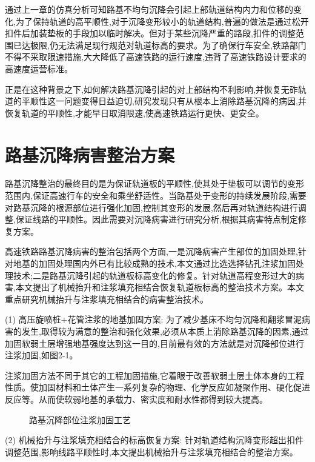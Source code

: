 \documentclass[a4paper,12pt]{ctexrep}
\begin{document}
通过上一章的仿真分析可知路基不均匀沉降会引起上部轨道结构内力和位移的变化,为了保持轨道的高平顺性,对于沉降变形较小的轨道结构,普遍的做法是通过松开扣件后加装垫板的手段加以临时解决。但对于某些沉降严重的路段,扣件的调整范围已达极限,仍无法满足现行规范对轨道标高的要求。为了确保行车安全,铁路部门不得不采取限速措施,大大降低了高速铁路的运行速度,违背了高速铁路设计要求的高速度运营标准。

正是在这种背景之下,如何解决路基沉降引起的对上部结构不利影响,并恢复无砟轨道的平顺性这一问题变得日益迫切,研究发现只有从根本上消除路基沉降的病因,并恢复轨道的平顺性,才能早日取消限速,使高速铁路运行更快、更安全。

\section{路基沉降病害整治方案}

路基沉降整治的最终目的是为保证轨道板的平顺性,使其处于垫板可以调节的变形范围内,保证高速行车的安全和乘坐舒适性。当路基处于变形的持续发展阶段,需要对路基沉降的根源部位进行强化加固,控制其变形的发展,然后再对轨道结构进行调整,保证线路的平顺性。因此需要对沉降病害进行研究分析,根据其病害特点制定修复方案。

高速铁路路基沉降病害的整治包括两个方面,一是沉降病害产生部位的加固处理,针对地基的加固处理国内外已有比较成熟的技术,本文通过比选选择钻孔注浆加固处理技术;二是路基沉降引起的轨道板标高变化的修复。针对轨道高程变形过大的病害,本文提出了机械抬升和注浆填充相结合恢复轨道板标高的整治技术方案。本文重点研究机械抬升与注浆填充相结合的病害整治技术。

(1) 高压旋喷桩+花管注浆的地基加固方案: 为了减少基床不均匀沉降和翻浆冒泥病害的发生,取得较为满意的整治和强化效果,必须从本质上消除路基沉降的因素,通过加固软弱土层增强地基强度达到这一目的,目前最有效的方法就是对沉降部位进行注浆加固,如图2-1。

注浆加固方法不同于其它的工程加固措施,它着眼于改善软弱土层土体本身的工程性质。使加固材料和土体产生一系列复杂的物理、化学反应如凝聚作用、硬化促进反应等。从而使软弱地基的承载力、密实度和耐水性都得到较大提高。

\begin{figure}[htbp]
    \centering
    \caption{路基沉降部位注浆加固工艺}
    \label{fig:2-1}
\end{figure}

(2) 机械抬升与注浆填充相结合的标高恢复方案: 针对轨道结构沉降变形超出扣件调整范围,影响线路平顺性时,本文提出机械抬升与注浆填充相结合的整治方案。
\end{document}
